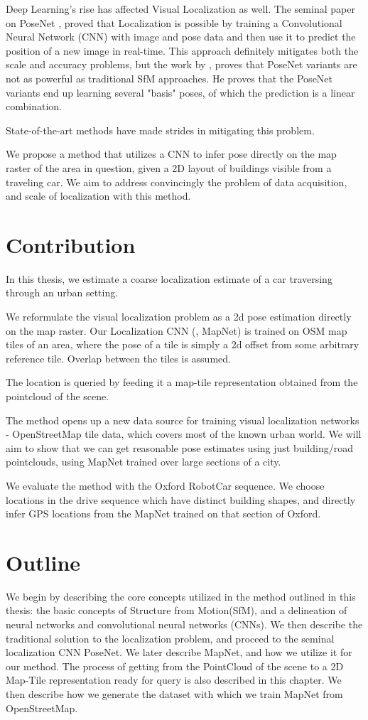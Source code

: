 Deep Learning's rise has affected Visual Localization as well. The seminal paper on PoseNet \cite{Kendall2015}, proved that Localization is possible by training a Convolutional Neural Network (CNN) with image and pose data and then use it to predict the position of a new image in real-time. This approach definitely mitigates both the scale and accuracy problems, but the work by \cite{Sattler2019}, proves that PoseNet variants are not as powerful as traditional SfM approaches. He proves that the PoseNet variants end up learning several "basis" poses, of which the prediction is a linear combination.  

State-of-the-art methods have made strides in mitigating this problem.

We propose a method that utilizes a CNN to infer pose directly on the map raster of the area in question, given a 2D layout of buildings visible from a traveling car. We aim to address convincingly the problem of data acquisition, and scale of localization with this method.  

\section{Contribution}
In this thesis, we estimate a coarse localization estimate of a car traversing through an urban setting. 

We reformulate the visual localization problem as a 2d pose estimation directly on the map raster. Our Localization CNN (\cite{Brahmbhatt2018}, MapNet) is trained on OSM map tiles of an area, where the pose of a tile is simply a 2d offset from some arbitrary reference tile. Overlap between the tiles is assumed.    

The location is queried by feeding it a map-tile representation obtained from the pointcloud of the scene. 

The method opens up a new data source for training visual localization networks - OpenStreetMap tile data, which covers most of the known urban world. We will aim to show that we can get reasonable pose estimates using just building/road pointclouds, using MapNet trained over large sections of a city. 

We evaluate the method with the Oxford RobotCar sequence. We choose locations in the drive sequence which have distinct building shapes, and directly infer GPS locations from the MapNet trained on that section of Oxford. 

\section{Outline}
We begin by describing the core concepts utilized in the method outlined in this thesis: the basic concepts of Structure from Motion(SfM), and a delineation of neural networks and convolutional neural networks (CNNs). We then describe the traditional solution to the localization problem, and proceed to the seminal localization CNN PoseNet. We later describe MapNet, and how we utilize it for our method. The process of getting from the PointCloud of the scene to a 2D Map-Tile representation ready for query is also described in this chapter. We then describe how we generate the dataset with which we train MapNet from OpenStreetMap.

